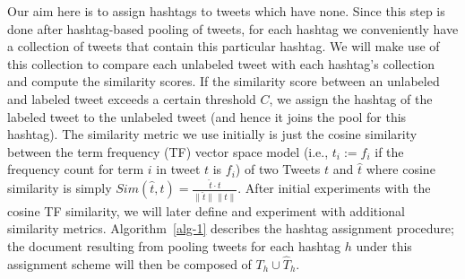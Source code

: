 \documentclass{sig-alternate}
\begin{document}
Our aim here is to assign hashtags to tweets which have none. Since
this step is done after hashtag-based pooling of tweets, for each
hashtag we conveniently have a collection of tweets that contain this
particular hashtag.  We will make use of this collection to compare
each unlabeled tweet with each hashtag's collection and compute the
similarity scores. If the similarity score between an unlabeled and
labeled tweet exceeds a certain threshold $C$, we assign the hashtag
of the labeled tweet to the unlabeled tweet (and hence it joins the
pool for this hashtag). The similarity metric we use initially is
just the cosine similarity between the term frequency (TF) vector
space model (i.e., $t_i := f_i$ if the frequency count for term $i$ in
tweet $t$ is $f_i$) of two Tweets $t$ and $\hat{t}$ where cosine
similarity is simply
 $ \mathit{Sim}(\hat{t},t) = \frac{\hat{t} \cdot t}{\|\hat{t}\| \|t\|}.$
After initial experiments with the cosine TF similarity, 
we will later define and experiment with additional similarity metrics.
Algorithm~\ref{alg-1} describes the hashtag assignment procedure;
the document resulting from pooling tweets for each hashtag $h$ under
this assignment scheme will then be composed of $T_h \cup \hat{T}_h$.

\end{document}

